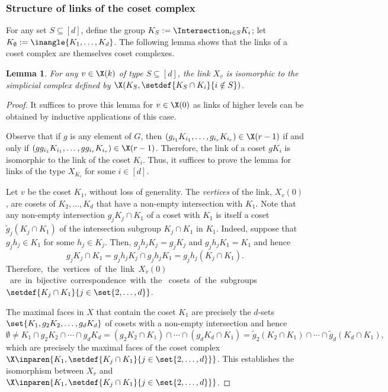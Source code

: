 \documentclass[11pt]{article}
\newtheorem{lemma}[theorem]{Lemma}
\begin{document}
\subsubsection*{Structure of links of the coset complex}  %


For any set $S \subseteq [d]$, define the group $K_S :=
\Intersection_{i\in S} K_i$; let $K_\emptyset := \inangle{K_1,\ldots,
  K_d}$. The following lemma shows that the links of a coset complex
are themselves coset complexes. 

\begin{lemma}\label{lem:link-structure}
  For any $v\in \X(k)$ of type $S \subseteq [d]$, the link $X_v$ is isomorphic to the simplicial complex defined by $\X(K_S, \setdef{K_{S} \cap K_i}{i\notin S})$. 
\end{lemma}
\begin{proof}
  It suffices to prove this lemma for $v \in \X(0)$ as links of higher levels can be obtained by inductive applications of this case.

Observe that if $g$ is any element of  $G$, then
  $(g_{i_1} K_{i_1}, \ldots, g_{i_r} K_{i_r}) \in \X(r-1)$ if and only
  if $(g g_{i_1} K_{i_1}, \ldots, g g_{i_r} K_{i_r}) \in \X(r-1)$.
  Therefore, the link of a coset $g K_i$ is isomorphic to the link of
  the coset $K_i$. Thus, it suffices to prove the lemma for links of
  the type $X_{K_i}$ for some $i \in [d]$. 

  Let $v$ be the coset $K_1$, without loss of generality.
  The \emph{vertices} of the link, $X_v(0)$, are cosets of $K_2,\ldots, K_d$ that have a non-empty intersection with $K_1$.
  Note that any non-empty intersection $g_j K_j \cap K_1$ of a coset with $K_1$ is itself a coset $\tilde{g}_j (K_j \cap K_1)$ of the intersection subgroup $K_j \cap K_1$ in $K_1$. Indeed, suppose that $g_j h_j \in K_1$ for some $h_j \in K_j$. Then, $g_j h_j K_j = g_j K_j$ and $g_j h_j K_1 = K_1$ and hence
  \[
    g_j K_j \cap K_1 = g_j h_j K_j \cap g_j h_j K_1 = g_j h_j (K_j \cap K_1).
  \]
%
%
%
%
Therefore,\ the\ vertices\ of\ the\ link\ $X_v(0)$\ are\ in\ bijective\
correspondence\ with\
the\ %
%
cosets\ of\
the\ subgroups\ %
%
$\setdef{K_j \cap K_1}{j \in \set{2,\ldots, d}}$.

  The maximal faces in $X$ that contain the coset $K_1$ are precisely
the %
$d$-sets %
%
$\set{K_1, g_2 K_2, \ldots, g_d K_d}$
of cosets %
%
%
with a non-empty intersection and hence
  \[
    \emptyset \neq K_1 \cap g_2 K_2 \cap  \cdots \cap g_d K_d = (g_2 K_2 \cap K_1) \cap \cdots \cap (g_d K_d \cap K_1) = \tilde{g}_2 (K_2 \cap K_1) \cap \cdots \cap \tilde{g}_d (K_d \cap K_1),
  \]
  which are  precisely the maximal faces of the coset complex
  $\X\inparen{K_1,\setdef{K_j \cap K_1}{j \in \set{2,\ldots,
        d}}}$.  This establishes the isomorphism between $X_v$ and $\X\inparen{K_1,\setdef{K_j \cap K_1}{j \in \set{2,\ldots,
        d}}}$.
\end{proof}
\end{document}
